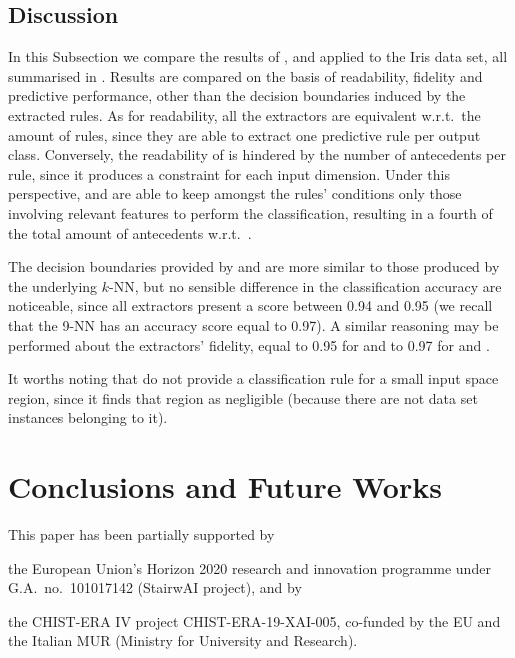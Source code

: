 \documentclass[
]{ceurart}
\begin{document}
\subsection{Discussion}



In this Subsection we compare the results of \cart{}, \iter{} and \gridex{} applied to the Iris data set, all summarised in .
%
Results are compared on the basis of readability, fidelity and predictive performance, other than the decision boundaries induced by the extracted rules.
%
As for readability, all the extractors are equivalent w.r.t.\ the amount of rules, since they are able to extract one predictive rule per output class.
%
Conversely, the readability of \iter{} is hindered by the number of antecedents per rule, since it produces a constraint for each input dimension.
%
Under this perspective, \cart{} and \gridex{} are able to keep amongst the rules' conditions only those involving relevant features to perform the classification, resulting in a fourth of the total amount of antecedents w.r.t.\ \iter{}.

The decision boundaries provided by \gridex{} and \iter{} are more similar to those produced by the underlying $k$-NN, but no sensible difference in the classification accuracy are noticeable, since all extractors present a score between 0.94 and 0.95 (we recall that the 9-NN has an accuracy score equal to 0.97).
%
A similar reasoning may be performed about the extractors' fidelity, equal to 0.95 for \cart{} and to 0.97 for \iter{} and \gridex{}.

It worths noting that \gridex{} do not provide a classification rule for a small input space region, since it finds that region as negligible (because there are not data set instances belonging to it).

\section{Conclusions and Future Works}\label{sec:conclusions}



\begin{acknowledgments}
	This paper has been partially supported by
	\begin{inlinelist}
		\item the European Union's Horizon 2020 research and innovation programme under G.A.\ no.\ 101017142 (StairwAI project), and by
		\item the CHIST-ERA IV project CHIST-ERA-19-XAI-005, co-funded by the EU and the Italian MUR (Ministry for University and Research).
	\end{inlinelist}
\end{acknowledgments}


\end{document}
